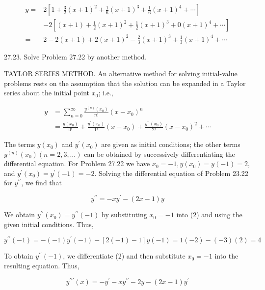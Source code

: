 \documentclass[10pt]{article}
\begin{document}
$$
\begin{aligned}
y= & 2\left[1+\frac{3}{2}(x+1)^{2}+\frac{1}{6}(x+1)^{3}+\frac{1}{6}(x+1)^{4}+\cdots\right] \\
& -2\left[(x+1)+\frac{1}{2}(x+1)^{2}+\frac{1}{2}(x+1)^{3}+0(x+1)^{4}+\cdots\right] \\
= & 2-2(x+1)+2(x+1)^{2}-\frac{2}{3}(x+1)^{3}+\frac{1}{3}(x+1)^{4}+\cdots
\end{aligned}
$$

27.23. Solve Problem 27.22 by another method.

TAYLOR SERIES METHOD. An alternative method for solving initial-value problems rests on the assumption that the solution can be expanded in a Taylor series about the initial point $x_{0}$; i.e.,


\begin{align*}
y & =\sum_{n=0}^{\infty} \frac{y^{(n)}\left(x_{0}\right)}{n !}\left(x-x_{0}\right)^{n} \\
& =\frac{y\left(x_{0}\right)}{0 !}+\frac{y^{\prime}\left(x_{0}\right)}{1 !}\left(x-x_{0}\right)+\frac{y^{\prime \prime}\left(x_{0}\right)}{2 !}\left(x-x_{0}\right)^{2}+\cdots \tag{1}
\end{align*}


The terms $y\left(x_{0}\right)$ and $y^{\prime}\left(x_{0}\right)$ are given as initial conditions; the other terms $y^{(n)}\left(x_{0}\right)(n=2,3, \ldots)$ can be obtained by successively differentiating the differential equation. For Problem 27.22 we have $x_{0}=-1, y\left(x_{0}\right)=y(-1)=2$, and $y^{\prime}\left(x_{0}\right)=y^{\prime}(-1)=-2$. Solving the differential equation of Problem 23.22 for $y^{\prime \prime}$, we find that


\begin{equation*}
y^{\prime \prime}=-x y^{\prime}-(2 x-1) y \tag{2}
\end{equation*}


We obtain $y^{\prime \prime}\left(x_{0}\right)=y^{\prime \prime}(-1)$ by substituting $x_{0}=-1$ into (2) and using the given initial conditions. Thus,


\begin{equation*}
y^{\prime \prime}(-1)=-(-1) y^{\prime}(-1)-[2(-1)-1] y(-1)=1(-2)-(-3)(2)=4 \tag{3}
\end{equation*}


To obtain $y^{\prime \prime}(-1)$, we differentiate (2) and then substitute $x_{0}=-1$ into the resulting equation. Thus,


\begin{equation*}
y^{\prime \prime \prime}(x)=-y^{\prime}-x y^{\prime \prime}-2 y-(2 x-1) y^{\prime} \tag{4}
\end{equation*}
\end{document}
